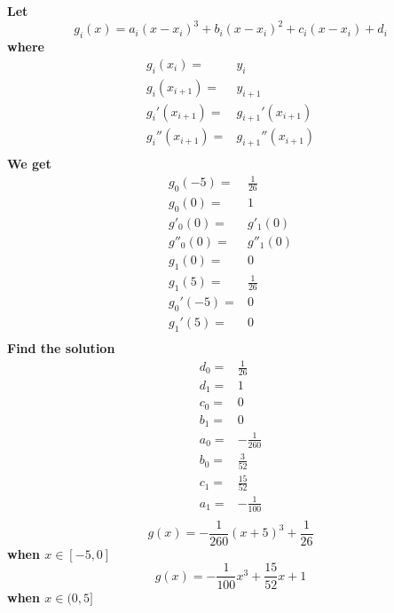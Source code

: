 \documentclass{article}
\begin{document}
        \subsection{}
            \paragraph{
                Let 
                $$g_i(x)=a_i(x-x_i)^3+b_i(x-x_i)^2+c_i(x-x_i)+d_i$$
                where
                \begin{equation*}
                    \begin{split}
                        g_i(x_i)=&y_i\\
                        g_i(x_{i+1})=&y_{i+1}\\
                        g_i'(x_{i+1})=&g_{i+1}'(x_{i+1})\\
                        g_i''(x_{i+1})=&g_{i+1}''(x_{i+1})\\
                    \end{split}
                \end{equation*}
                We get
                \begin{equation*}
                    \begin{split}
                        g_0(-5)=&\frac{1}{26}\\
                        g_0(0)=&1\\
                        g'_0(0)=&g'_1(0)\\
                        g''_0(0)=&g''_1(0)\\
                        g_1(0)=&0\\
                        g_1(5)=&\frac{1}{26}\\
                        g_0'(-5)=&0\\
                        g_1'(5)=&0\\
                    \end{split}
                \end{equation*}
                Find the solution
                \begin{equation*}
                    \begin{split}
                        d_0=&\frac{1}{26}\\
                        d_1=&1\\
                        c_0=&0\\
                        b_1=&0\\
                        a_0=&-\frac{1}{260}\\
                        b_0=&\frac{3}{52}\\
                        c_1=&\frac{15}{52}\\
                        a_1=&-\frac{1}{100}\\
                    \end{split}
                \end{equation*}
                $$g(x)=-\frac{1}{260}(x+5)^3+\frac{1}{26}$$
                when $x\in[-5,0]$
                $$g(x)=-\frac{1}{100}x^3+\frac{15}{52}x+1$$
                when $x\in(0,5]$
            }
\end{document}
